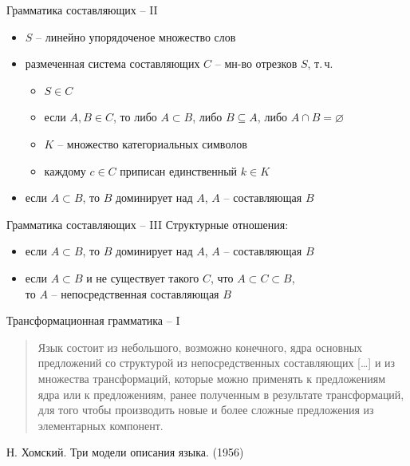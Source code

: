 \documentclass{beamer}
\begin{document}
\begin{frame}{Грамматика составляющих -- II}
\begin{small}
\begin{itemize}
    \item $S$ -- линейно упорядоченое множество слов
    \item размеченная система составляющих $C$ -- мн-во отрезков $S$, т.\,ч.
        \begin{itemize}
            \item $S \in C$
            \item если $A, B \in C$, то либо $A \subset B$, либо $B \subseteq A$, либо $A \cap B = \varnothing$
            \item $K$ -- множество категориальных символов
            \item каждому $c \in C$ приписан единственный $k \in K$
        \end{itemize}
    \item если $A \subset B$, то $B$ доминирует над $A$, $A$ -- составляющая $B$
\end{itemize}
\end{small}
\end{frame}

\begin{frame}{Грамматика составляющих -- III}
Структурные отношения:\\
\medskip
\begin{small}
\begin{itemize}
    \item если $A \subset B$, то $B$ доминирует над $A$, $A$ -- составляющая $B$
    \item если $A \subset B$ и не существует такого $C$, что $A \subset C \subset B$, \\то $A$ -- непосредственная составляющая $B$
\end{itemize}
\end{small}
\end{frame}

\begin{frame}{Трансформационная грамматика -- I}
\begin{quote}
Язык состоит из небольшого, возможно конечного, ядра основных предложений со структурой из непосредственных составляющих [\dots] и из множества трансформаций, которые можно применять к предложениям ядра или к предложениям, ранее полученным в результате трансформаций, для того чтобы производить новые и более сложные предложения из элементарных компонент.
\end{quote}
\begin{flushright}
Н. Хомский. Три модели описания языка. (1956)
\end{flushright}
\end{frame}
\end{document}
